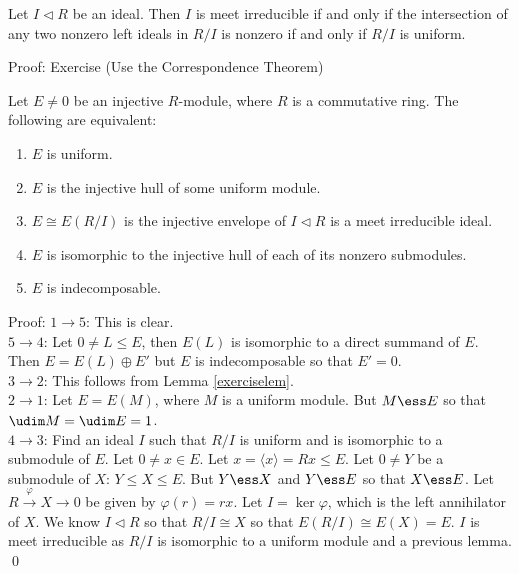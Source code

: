 \begin{lem}\label{exerciselem}
Let $I \lhd R$ be an ideal. Then $I$ is meet irreducible if and only if the intersection of any two nonzero left ideals in $R/I$ is nonzero if and only if $R/I$ is uniform. 
\end{lem}

Proof: Exercise (Use the Correspondence Theorem) \\

\begin{lem}
Let $E \neq 0$ be an injective $R$-module, where $R$ is a commutative ring. The following are equivalent:
\begin{enumerate}[1.]
\item $E$ is uniform.
\item $E$ is the injective hull of some uniform module.
\item $E \cong E(R/I)$ is the injective envelope of $I \lhd R$ is a meet irreducible ideal.
\item $E$ is isomorphic to the injective hull of each of its nonzero submodules.
\item $E$ is indecomposable. 
\end{enumerate}
\end{lem}

Proof: $1 \rightarrow 5$: This is clear. \\

$5 \rightarrow 4$: Let $0 \neq L \leq E$, then $E(L)$ is isomorphic to a direct summand of $E$. Then $E=E(L) \oplus E'$ but $E$ is indecomposable so that $E'=0$. \\

$3 \rightarrow 2$: This follows from Lemma \ref{exerciselem}. \\

$2 \rightarrow 1$: Let $E=E(M)$, where $M$ is a uniform module. But $M \ess E$ so that $\udim M =\udim E=1$. \\

$4 \rightarrow 3$: Find an ideal $I$ such that $R/I$ is uniform and is isomorphic to a submodule of $E$. Let $0 \neq x \in E$. Let $x=\langle x \rangle=Rx \leq E$. Let $0 \neq Y$ be a submodule of $X$: $Y \leq X \leq E$. But $Y \ess X$ and $Y \ess E$ so that $X \ess E$. Let $R \stackrel{\varphi}{\rightarrow} X \rightarrow 0$ be given by $\varphi(r)=rx$. Let $I=\ker \varphi$, which is the left annihilator of $X$. We know $I \lhd R$ so that $R/I \cong X$ so that $E(R/I) \cong E(X)=E$. $I$ is meet irreducible as $R/I$ is isomorphic to a uniform module and a previous lemma. \qed \\

